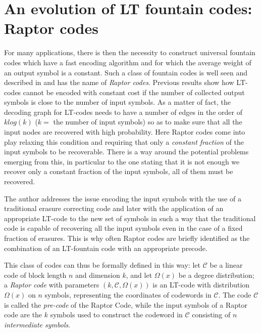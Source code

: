 \section{An evolution of LT fountain codes: Raptor codes}
\label{sec:raptor}
For many applications, there is then the necessity to construct universal fountain codes which have a fast encoding algorithm and for which the average weight of an output symbol is a constant. Such a class of fountain codes is well seen and described in \cite{Shokrollahi2006} and has the name of \textit{Raptor codes}. Previous results show how LT-codes cannot be encoded with constant cost if the number of collected output symbols is close to the number of input symbols. As a matter of fact, the decoding graph for LT-codes needs to have a number of edges in the order of $klog(k)$ ($k =$ the number of input symbols) so as to make sure that all the input nodes are recovered with high probability. Here Raptor codes come into play relaxing this condition and requiring that only a \textit{constant fraction} of the input symbols to be recoverable. There is a way around the potential problems emerging from this, in particular to the one stating that it is not enough we recover only a constant fraction of the input symbols, all of them must be recovered.

The author addresses the issue encoding the input symbols with the use of a traditional erasure correcting code and later with the application of an appropriate LT-code to the new set of symbols in such a way that the traditional code is capable of recovering all the input symbols even in the case of a fixed fraction of erasures. This is why often Raptor codes are briefly identified as the combination of an LT-fountain code with an appropriate precode.

This class of codes can thus be formally defined in this way: let $\mathcal{C}$ be a linear code of block length $n$ and dimension $k$, and let $\Omega(x)$ be a degree distribution; a \textit{Raptor code} with parameters $(k,\mathcal{C},\Omega(x))$ is an LT-code with distribution $\Omega(x)$ on $n$ symbols, representing the coordinates of codewords in $\mathcal{C}$. The code $\mathcal{C}$ is called the \textit{pre-code} of the Raptor Code, while the input symbols of a Raptor code are the $k$ symbols used to construct the codeword in $\mathcal{C}$ consisting of $n$ \textit{intermediate symbols}.
